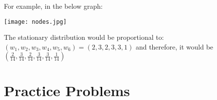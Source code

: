 \documentclass[11.5pt]{article}
\begin{document}
\begin{notes}
For example, in the below graph:
\begin{center}
\texttt{[image: nodes.jpg]}
\end{center}

The stationary distribution would be proportional to: 
$(w_1, w_2, w_3, w_4, w_5, w_6) = (2, 3, 2, 3, 3, 1)$ and therefore, it would be $\left(\frac{2}{14},\frac{3}{14},\frac{2}{14},\frac{3}{14},\frac{3}{14},\frac{1}{14} \right)$

\end{notes}
\newpage
\section*{Practice Problems} 

\begin{comment}
\begin{exercise}{Two Coins}
One of two identical-looking coins is picked from a hat randomly, where one coin has probability $p_1$ of Heads and the other has probability $p_2$ of Heads. Let $X$ be the number of Heads after flipping the chosen coin $n$ times. Find the mean and variance of $X$
\end{exercise}

\begin{solution}{2.5}
We use the law of total expectation to condition on which coin we selected. Let $I$ be an indicator random variable of selecting coin 1. Then we have: 

$$ E(X) = E(X | I = 1) \cdot P( I = 1) + E(X | I = 0) \cdot P(I = 0) $$
which simplifies to: 
$$ p_1 \cdot \frac{1}{2} + p_2 \cdot \frac{1}{2} = \frac{p_1 + p_2}{2}$$ 

We will use Eve's Law to calculate the variance: 
\begin{align*}
\var(X) &= E( \var{(X| I)}) + \var{(E(X| I))} 
\end{align*}
Now, we write $\var(X | I)$ and $E(X | I)$ in terms of $I$: 
\begin{align*}
\var(X | I) &= Inp_1(1-p_1)+(1-I)np_2(1-p_2)\\
E(X | I) &= Inp_1 + (1 - I)np_2
\end{align*}

Plugging in, we get: 
$$\var(X) = \frac{1}{2} (np_1(1 - p_1) + np_2(1 - p_2)) +\frac{1}{4}n^2(p_1 - p_2)^2$$
\end{solution}


\newpage
\begin{exercise}{Emails}
Emails arrive one at a time in an inbox. Let $T_n$ be the time at which the $n$th email arrives (measured on a continuous scale from some starting point in time). Suppose that
the waiting times between emails are i.i.d. $\Expo(\lambda)$, i.e., $T_1, T_2-T_1, T_3-T_2, \ldots$ are i.i.d.
$\Expo(\lambda)$. Each email is non-spam with probability $p$, and spam with probability $q = 1 - p$ (independently of the other emails and of the waiting times). Let $X$ be the time at which the first non-spam email arrives (so $X$ is a continuous r.v., with $X$ = $T_1$ if the 1st email is non-spam, $X = T_2$ if the 1st email is spam but the 2nd one isn't, etc...)


\end{comment}
\end{document}
